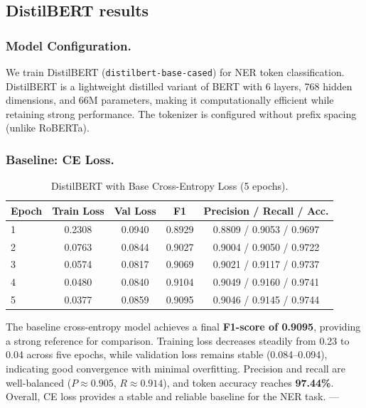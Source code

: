 \subsection{DistilBERT results}

\subsubsection{Model Configuration.}
We train DistilBERT (\texttt{distilbert-base-cased}) for NER token classification.
DistilBERT is a lightweight distilled variant of BERT with 6 layers, 768 hidden dimensions, and 66M parameters,
making it computationally efficient while retaining strong performance. The tokenizer is configured without
prefix spacing (unlike RoBERTa).

\subsubsection{Baseline: CE Loss.}

\begin{table}[H]
\centering
\caption{DistilBERT with Base Cross-Entropy Loss (5 epochs).}
\begin{tabular}{lcccc}
\hline
\textbf{Epoch} & \textbf{Train Loss} & \textbf{Val Loss} & \textbf{F1} & \textbf{Precision} / \textbf{Recall} / \textbf{Acc.} \\
\hline
1 & 0.2308 & 0.0940 & 0.8929 & 0.8809 / 0.9053 / 0.9697 \\
2 & 0.0763 & 0.0844 & 0.9027 & 0.9004 / 0.9050 / 0.9722 \\
3 & 0.0574 & 0.0817 & 0.9069 & 0.9021 / 0.9117 / 0.9737 \\
4 & 0.0480 & 0.0840 & 0.9104 & 0.9049 / 0.9160 / 0.9741 \\
5 & 0.0377 & 0.0859 & 0.9095 & 0.9046 / 0.9145 / 0.9744 \\
\hline
\end{tabular}
\label{tab:distilbert_base_ce}
\end{table}

The baseline cross-entropy model achieves a final \textbf{F1-score of 0.9095}, providing a strong reference for comparison. 
Training loss decreases steadily from 0.23 to 0.04 across five epochs, while validation loss remains stable (0.084--0.094), indicating good convergence with minimal overfitting. 
Precision and recall are well-balanced ($P \approx 0.905$, $R \approx 0.914$), and token accuracy reaches \textbf{97.44\%}. 
Overall, CE loss provides a stable and reliable baseline for the NER task.
---

